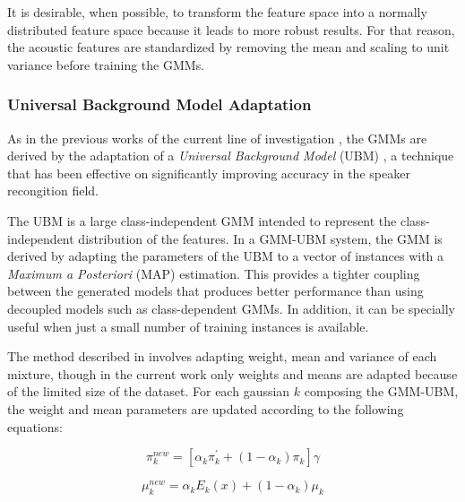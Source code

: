 It is desirable, when possible, to transform the feature space into a normally distributed feature
space because it leads to more robust results. For that reason, the acoustic features are
standardized by removing the mean and scaling to unit variance before training the GMMs.

\subsubsection{Universal Background Model Adaptation}

As in the previous works of the current line of investigation
\cite{detection_phone_level_mispronunciation_learning, main},
the GMMs are derived by the adaptation of a \textit{Universal Background Model} (UBM)
\cite{ubm_adaptation}, a technique that has been effective on significantly improving
accuracy in the speaker recongition field.

The UBM is a large class-independent GMM intended to represent the class-independent distribution
of the features. In a GMM-UBM system, the GMM is derived by adapting the parameters of the UBM
to a vector of instances with a \textit{Maximum a Posteriori} (MAP) estimation. This provides a
tighter coupling between the generated models that produces better performance than using
decoupled models such as class-dependent GMMs. In addition, it can be specially useful when
just a small number of training instances is available.

The method described in \cite{ubm_adaptation} involves adapting weight, mean and variance of each
mixture, though in the current work only weights and means are adapted because of the limited
size of the dataset. For each gaussian $k$ composing the GMM-UBM, the weight and mean parameters
are updated according to the following equations:

\begin{equation}
  \pi_{k}^{new} = [\alpha_{k} \pi_{k}^{'} + (1-\alpha_{k}) \pi_{k}]\gamma
\end{equation}

\begin{equation}
  \mu_{k}^{new} = \alpha_{k} E_{k}(x) + (1-\alpha_{k})\mu_{k}
\end{equation}

